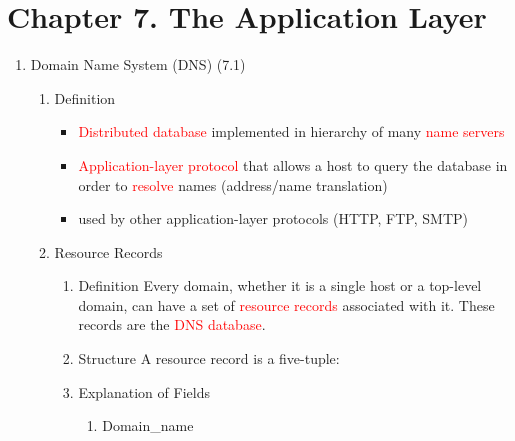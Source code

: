 \documentclass[a4paper,10pt]{article}
\newcommand{\red}[1]{\textcolor{red}{#1}}
\begin{document}
\begin{enumerate}
\begin{enumerate}
\begin{itemize}
      \end{itemize}
  \end{enumerate}
\end{enumerate}

\newpage\section*{Chapter 7. The Application Layer}
\begin{enumerate}
  \item Domain Name System (DNS) (7.1)
    \begin{enumerate}
      \item Definition
        \begin{itemize}
          \item \red{Distributed database} implemented in hierarchy of many \red{name servers}
          \item \red{Application-layer protocol} that allows a host to query the database in order to \red{resolve} names (address/name translation)
          \item used by other application-layer protocols (HTTP, FTP, SMTP)
        \end{itemize}
      \item Resource Records
        \begin{enumerate}
          \item Definition
            \newline Every domain, whether it is a single host or a top-level domain, can have a set of \red{resource records} associated with it. These records are the \red{DNS database}.
          \item Structure
            \newline A resource record is a five-tuple:
            \newline{}
          \item Explanation of Fields
            \begin{enumerate}
              \item Domain\_name

\end{enumerate}
\end{enumerate}
\end{enumerate}
\end{enumerate}
\end{document}
